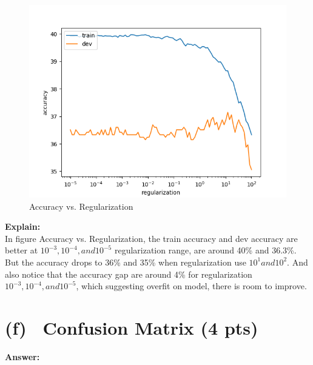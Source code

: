 \documentclass[fleqn]{MJD}
\newcommand{\subproblem}[2]{\section{(#1)~ #2}}
\newcommand{\0}{\emptyset}
\begin{document}
\begin{figure}[!htbp]\centering
	\label{figure:acc_vs_reg}
	\caption{Accuracy vs. Regularization}
	\includegraphics[scale=0.7]{q4_reg_v_acc.png}
\end{figure}
\noindent \textbf{Explain:}\\
\noindent In figure Accuracy vs. Regularization, the train accuracy and dev accuracy are better at $10^{-3}, 10^{-4}, and 10^{-5}$ regularization range, are around 40\% and 36.3\%. But the accuracy drops to 36\% and 35\% when regularization use $10^{1} and 10^{2}$. And also notice that the accuracy gap are around 4\% for regularization  $10^{-3}, 10^{-4}, and 10^{-5}$, which suggesting overfit on model, there is room to improve.

\newpage
\subproblem{f}{Confusion Matrix (4 pts)}

\textbf{Answer:}\\
\end{document}
